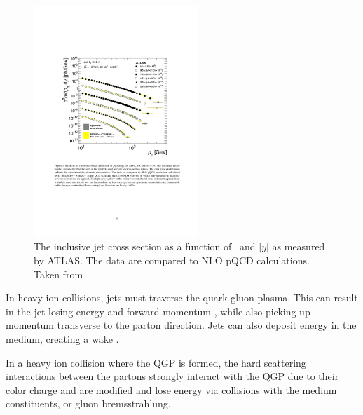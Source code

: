 \begin{figure}[htbp]
\begin{center}
\includegraphics[width=0.55\textwidth]{figures/theory/inclJetCS}
\caption{The inclusive jet cross section as a function of \pt\ and $|y|$ as measured by ATLAS. The data are compared to NLO pQCD calculations. Taken from \cite{Aaboud:2017wsi}}
\label{fig:bjorkenX}
\end{center}
\end{figure}




In heavy ion collisions, jets must traverse the quark gluon plasma. This can result in the jet losing energy and forward momentum \cite{2012176, ATLAS:2017wvp}, while also picking up momentum transverse to the parton direction. Jets can also deposit energy in the medium, creating a wake \cite{Khachatryan2016}. 


In a heavy ion collision where the QGP is formed, the hard scattering interactions between the partons strongly interact with the QGP due to their color charge and are modified and lose energy via collisions with the medium constituents, or gluon bremsstrahlung. 